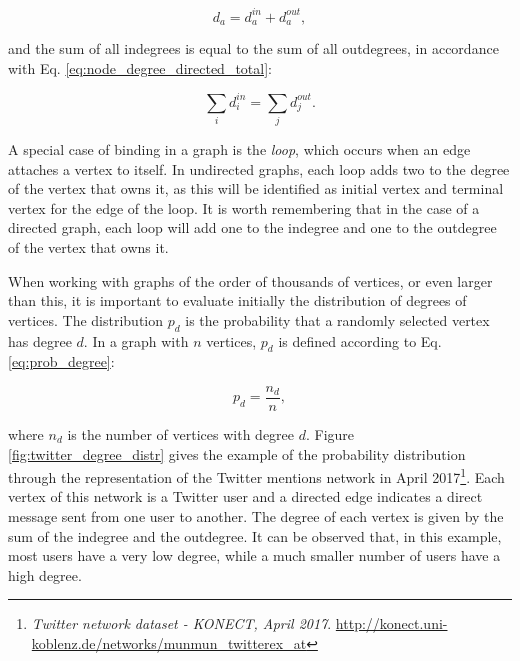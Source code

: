 \begin{equation} 
\label{eq:node_degree_directed}
    d_a = d_a^{in} + d_a^{out},
\end{equation}

and the sum of all indegrees is equal to the sum of all outdegrees, in accordance with Eq. \ref{eq:node_degree_directed_total}:

\begin{equation}
\label{eq:node_degree_directed_total}
    \sum_{i}d_i^{in} = \sum_{j}d_j^{out}.
\end{equation}

A special case of binding in a graph is the {\em loop}, which occurs when an edge attaches a vertex to itself. In undirected graphs, each loop adds two to the degree of the vertex that owns it, as this will be identified as initial vertex and terminal vertex for the edge of the loop. It is worth remembering that in the case of a directed graph, each loop will add one to the indegree and one to the outdegree of the vertex that owns it.

When working with graphs of the order of thousands of vertices, or even larger than this, it is important to evaluate initially the distribution of degrees of vertices. The distribution $p_d$ is the probability that a randomly selected vertex has degree $d$. In a graph with $n$ vertices, $p_d$ is defined according to Eq. \ref{eq:prob_degree}:

\begin{equation}
    \label{eq:prob_degree}
    p_d = \frac{n_d}{n},
\end{equation}

where $n_d$ is the number of vertices with degree $d$. Figure \ref{fig:twitter_degree_distr} gives the example of the probability distribution through the representation of the Twitter mentions network in April 2017\footnote{\textit{Twitter network dataset - KONECT, April 2017}. \url{http://konect.uni-koblenz.de/networks/munmun_twitterex_at}}. Each vertex of this network is a Twitter user and a directed edge indicates a direct message sent from one user to another. The degree of each vertex is given by the sum of the indegree and the outdegree. It can be observed that, in this example, most users have a very low degree, while a much smaller number of users have a high degree.


